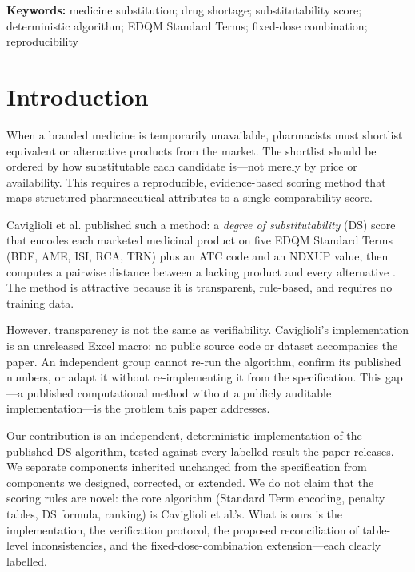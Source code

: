 \documentclass[12pt]{article}
\begin{document}
\vspace{2pt}
\noindent\textbf{Keywords:} medicine substitution; drug shortage; substitutability score; deterministic algorithm; EDQM Standard Terms; fixed-dose combination; reproducibility

\section{Introduction}
\label{sec:intro}

When a branded medicine is temporarily unavailable, pharmacists must shortlist equivalent or alternative products from the market. The shortlist should be ordered by how substitutable each candidate is---not merely by price or availability. This requires a reproducible, evidence-based scoring method that maps structured pharmaceutical attributes to a single comparability score.

Caviglioli et al.\citep{caviglioli2025medicine} published such a method: a \emph{degree of substitutability} (DS) score that encodes each marketed medicinal product on five EDQM Standard Terms (BDF, AME, ISI, RCA, TRN) plus an ATC code and an NDXUP value, then computes a pairwise distance between a lacking product and every alternative \citep{caviglioli2025medicine}. The method is attractive because it is transparent, rule-based, and requires no training data.

However, transparency is not the same as verifiability. Caviglioli's implementation is an unreleased Excel macro; no public source code or dataset accompanies the paper. An independent group cannot re-run the algorithm, confirm its published numbers, or adapt it without re-implementing it from the specification. This gap---a published computational method without a publicly auditable implementation---is the problem this paper addresses.

Our contribution is an independent, deterministic implementation of the published DS algorithm, tested against every labelled result the paper releases. We separate components inherited unchanged from the specification from components we designed, corrected, or extended. We do not claim that the scoring rules are novel: the core algorithm (Standard Term encoding, penalty tables, DS formula, ranking) is Caviglioli et al.'s. What is ours is the implementation, the verification protocol, the proposed reconciliation of table-level inconsistencies, and the fixed-dose-combination extension---each clearly labelled.
\end{document}
